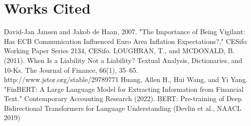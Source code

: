 \documentclass[12pt, letterpaper]{article}
\begin{document}
\section{Works Cited}


\printbibliography






David-Jan Jansen and Jakob de Haan, 2007. "The Importance of Being Vigilant: Has ECB Communication Influenced Euro Area Inflation Expectations?," CESifo Working Paper Series 2134, CESifo.
\bigskip
LOUGHRAN, T., and MCDONALD, B. (2011). When Is a Liability Not a Liability? Textual Analysis, Dictionaries, and 10-Ks. The Journal of Finance, 66(1), 35–65. http://www.jstor.org/stable/29789771
\bigskip
Huang, Allen H., Hui Wang, and Yi Yang. "FinBERT: A Large Language Model for Extracting Information from Financial Text." Contemporary Accounting Research (2022).
\bigskip
BERT: Pre-training of Deep Bidirectional Transformers for Language Understanding (Devlin et al., NAACL 2019)
\end{document}
